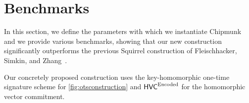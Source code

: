 \section{Benchmarks}\label{sec:benchmarks}


In this section, we define the parameters with which we instantiate Chipmunk and we provide various benchmarks, showing that our new construction significantly outperforms the previous Squirrel construction of Fleischhacker, Simkin, and Zhang~\cite{CCS:FleSimZha22}.

Our concretely proposed construction uses the key-homomorphic one-time signature scheme for \autoref{fig:otsconstruction} and $\mathsf{HVC}^{\textrm{Encoded}}$ for the homomorphic vector commitment.

